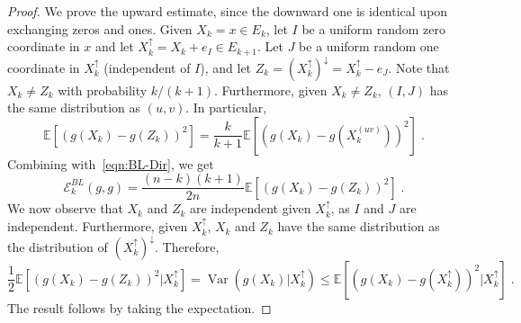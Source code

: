 \documentclass[12pt,final]{amsart}
\newcommand{\var}{\operatorname{Var}}
\newcommand{\1}{\mathbf{1}}
\newcommand{\Ecal}{\mathcal{E}}
\begin{document}
\begin{proof}
We prove the upward estimate, since the downward one is identical upon exchanging zeros and ones. 
Given $X_k=x\in E_k$, let $I$ be a uniform random zero coordinate in $x$ and let $X^{\uparrow}_k=X_k+e_{I}\in E_{k+1}$. Let $J$ be a uniform random one coordinate in $X_k^\uparrow$ (independent of $I$), and let $Z_k=(X_k^\uparrow)^{\downarrow}=X_k^\uparrow-e_J$. Note that $X_k\ne Z_k$ with probability $k/(k+1)$. Furthermore, given $X_k\neq Z_k$, $(I, J)$ has the same distribution as $(u, v)$. In particular, 
\[
\mathbb{E}\left[\left(g(X_k)-g(Z_k)\right)^2\right] = \frac{k}{k+1}\mathbb{E}\left[\left(g(X_k)-g(X^{(uv)}_k)\right)^2\right]\;.
\]
Combining with~\eqref{eqn:BL-Dir}, we get
\[
    \mathcal{E}_k^{BL}(g, g) = \frac{(n-k)(k+1)}{2n} \mathbb{E}\left[\left(g(X_k)-g(Z_k)\right)^2\right]\;.
\]
We now observe that $X_k$ and $Z_k$ are independent given $X^\uparrow_k$, as $I$ and $J$ are independent. Furthermore, given $X_k^\uparrow$, $X_k$ and $Z_k$ have the same distribution as the distribution of $(X^\uparrow_k)^\downarrow$. Therefore,
    \[
    \frac{1}{2}\mathbb{E}\left[\left(g(X_k)-g(Z_k)\right)^2\vert X^\uparrow_k \right]=\var(g(X_k)\vert X_k^\uparrow)\leq \mathbb{E}\left[\left(g(X_k)-g(X_k^\uparrow)\right)^2\Big| X_k^\uparrow\right]\;.
    \]
The result follows by taking the expectation.
\end{proof}
\end{document}

